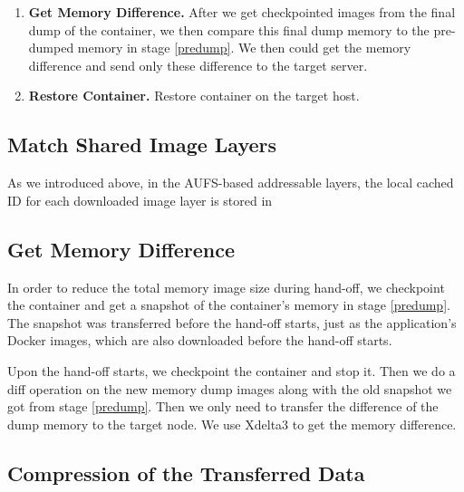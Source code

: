 \begin{enumerate}[label=\textbf{S\arabic*}]
\item \label{img-sync} \textbf{Get Memory Difference.} After we get checkpointed images from the final dump of the container, we then compare this final dump memory to the pre-dumped memory in stage \ref{predump}. We then could get the memory difference and send only these difference to the target server. 

\item \label{restore} \textbf{Restore Container.} Restore container on the target host.

\end{enumerate}


 
\subsection{Match Shared Image Layers}

As we introduced above, in the AUFS-based addressable layers, the local cached ID for each downloaded image layer is stored in 

\subsection{Get Memory Difference}
In order to reduce the total memory image size during hand-off, we checkpoint the container and get a snapshot of the container's memory in stage \ref{predump}. The snapshot was transferred before the hand-off starts, just as the application's Docker images, which are also downloaded before the hand-off starts.

Upon the hand-off starts, we checkpoint the container and stop it. Then we do a diff operation on the new memory dump images along with the old snapshot we got from stage \ref{predump}. Then we only need to transfer the difference of the dump memory to the target node. We use Xdelta3 to get the memory difference.



\subsection{Compression of the Transferred Data}

